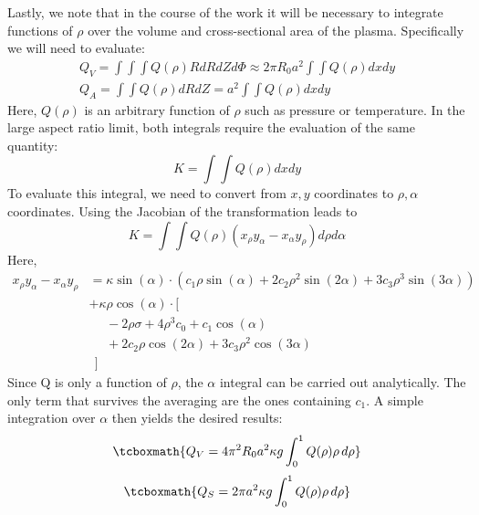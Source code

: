 Lastly, we note that in the course of the work it will be necessary to integrate functions of $\rho$ over the volume and cross-sectional area of the plasma. Specifically we will need to evaluate:
\begin{gather}
	Q_V = \int \int \int Q(\rho) R dR dZ d\Phi \approx 2 \pi R_0 a^2 \int \int Q(\rho) dx dy \\
	Q_A = \int \int Q(\rho) dR dZ = a^2 \int \int Q(\rho) dx dy
\end{gather}
Here, $Q(\rho)$ is an arbitrary function of $\rho$ such as pressure or temperature. In the large aspect ratio limit, both integrals require the evaluation of the same quantity:
\begin{equation}
	K = \int \int Q(\rho) dx dy
\end{equation}
To evaluate this integral, we need to convert from $x, y$ coordinates to $\rho, \alpha$ coordinates. Using the Jacobian of the transformation leads to
\begin{equation}
	K = \int \int Q(\rho) (x_\rho y_\alpha - x_\alpha y_\rho ) d\rho d\alpha
\end{equation}
Here,
\begin{equation}
\begin{split}
	x_\rho y_\alpha - x_\alpha y_\rho & = \kappa \sin(\alpha) \cdot \left( c_1 \rho \sin(\alpha) + 2 c_2 \rho^2 \sin(2\alpha)  + 3 c_3 \rho^3 \sin(3\alpha)  \right) \\
		& + \kappa \rho \cos(\alpha) \cdot \Big[ \\
		& \ \ \ \ \ \ -2 \rho \sigma + 4 \rho^3 c_0 + c_1 \cos(\alpha) \\
		& \ \ \ \ \ \ + 2 c_2 \rho \cos(2\alpha) + 3 c_3 \rho^2 \cos(3\alpha) \\
		& \ \ \Big]
\end{split}
\end{equation}
Since Q is only a function of $\rho$, the $\alpha$ integral can be carried out analytically. The only term that survives the averaging are the ones containing $c_1$. A simple integration over $\alpha$ then yields the desired results:
\begin{equation}
  	\label{eq:qv}
  	\tcboxmath{
 	Q_V = 4 \pi^2 R_0 a^2 \kappa g \int_0^1 Q(\rho) \rho \, d\rho
 	}
\end{equation}
\begin{equation}
	\label{eq:qs}
  	\tcboxmath{
	Q_S = 2 \pi a^2 \kappa g \int_0^1 Q(\rho) \rho \, d\rho
	}
\end{equation}
